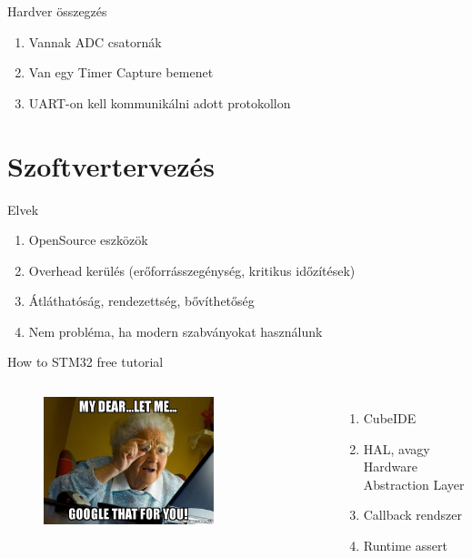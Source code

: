 \documentclass[aspectratio=169,xcolor=dvipsnames]{beamer}
\begin{document}
\begin{frame}{Hardver összegzés}
	\begin{enumerate}
		\item Vannak ADC csatornák
		\item Van egy Timer Capture bemenet
		\item UART-on kell kommunikálni adott protokollon
	\end{enumerate}
\end{frame}

\section{Szoftvertervezés}

\begin{frame}{Elvek}
	\begin{enumerate}
		\item OpenSource eszközök
		\item Overhead kerülés (erőforrásszegénység, kritikus időzítések)
		\item Átláthatóság, rendezettség, bővíthetőség
		\pause
		\item Nem probléma, ha modern szabványokat használunk
	\end{enumerate}
\end{frame}

\begin{frame}{How to STM32 free tutorial}
    \begin{columns}[c] 
       		\begin{figure}[h]
				\includegraphics[width=0.7\textwidth]{google-it}
			\end{figure}
        
        \pause

			\begin{enumerate}
				\item CubeIDE
				\item HAL, avagy Hardware Abstraction Layer
				\item Callback rendszer
				\item Runtime assert
			\end{enumerate}
		\end{columns}
\end{frame}
\end{document}
